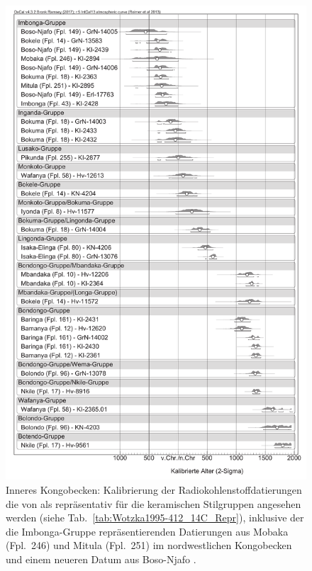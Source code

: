 \begin{figure}[p]
	\centering
	\includegraphics[width = .925\textwidth]{fig/14C_InnerCongo_Stylegroups_published.pdf}
	\caption{Inneres Kongobecken: Kalibrierung der Radiokohlenstoffdatierungen die von \textcite[67--210, 412]{Wotzka.1995} als repräsentativ für die keramischen Stilgruppen angesehen werden (siehe Tab.~\ref{tab:Wotzka1995-412_14C_Repr}), inklusive der die Imbonga-Gruppe repräsentierenden Datierungen aus Mobaka (Fpl.~246) und Mitula (Fpl.~251) im nordwestlichen Kongobecken und einem neueren Datum aus Boso-Njafo \parencite{Kahlheber.2014}.}
	\label{fig:14C_InnerCongo_Stylegroups}
\end{figure}


